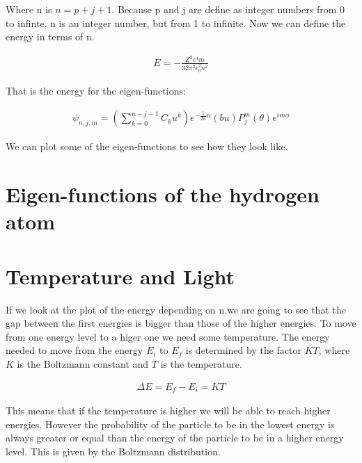 Where n is $n=p+j+1$. Because p and j are define as integer numbers from 0 to infinte, n is an integer number, but from 1 to infinite. Now we can define the energy in terms of n.

\begin{equation}
  \begin{array}{c}
    E = -\frac{Z^2 e^4 m}{32\pi^2\epsilon_0^2 n^2}
  \end{array}
\end{equation}

That is the energy for the eigen-functions:

\begin{equation}
  \begin{array}{c}
    \psi_{n,j,m} = \left(\sum_{k=0}^{n-j-1} C_k u^k \right)e^{-\frac{1}{2n}u}(bu)P_j^m(\theta)e^{im\phi}
  \end{array}
\end{equation}

We can plot some of the eigen-functions to see how they look like.

\section{Eigen-functions of the hydrogen atom}




\section{Temperature and Light}

If we look at the plot of  the energy depending on n,we are going to see that the gap between the first energies is bigger than those of the higher energies. To move from one energy level to a higer one we need some temperature. The energy needed to move from the energy $E_i$ to $E_f$ is determined by the factor $KT$, where $K$ is the Boltzmann constant and $T$ is the temperature.

\begin{equation}
  \begin{array}{c}
    \Delta E = E_f - E_i = KT
  \end{array}
\end{equation}

This means that if the temperature is higher we will be able to reach higher energies. However the probability of the particle to be in the lowest energy is always greater or equal than the energy of the particle to be in a higher energy level. This is given by the Boltzmann distribution.

